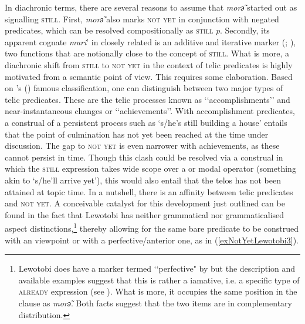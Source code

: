 In diachronic terms, there are several reasons to assume that \textit{morә̃} started out as signalling \textsc{still}. First, \textit{morә̃} also marks \textsc{not yet} in conjunction with negated predicates, which can be resolved compositionally as \textsc{still} \neg{}\textit{p}. Secondly,  its apparent cognate \mbox{\textit{muri}'} in closely related  is an additive and iterative marker (\cite{NishiyamaKelen2007}; \cite{Pampus2010}), two functions that are notionally close to the concept of \textsc{still}.  What is more, a diachronic shift from \textsc{still} to \textsc{not yet} in the context of telic predicates is highly motivated from a semantic point of view. This requires some elaboration. Based on \citeauthor{Vendler1957}'s (\citeyear{Vendler1957}) famous classification, one can distinguish between two major types of telic predicates. These are the telic processes known as \lq\lq accomplishments\rq\rq{ }and near-instantaneous changes or \lq\lq{}achievements\rq\rq. With accomplishment predicates, a construal of a persistent process such as \lq s/he's still building a house\rq{ }entails that the point of culmination has not  yet been reached at the time under discussion. The gap to \textsc{not yet} is even narrower with achievements, as these cannot persist in time. Though this clash could be resolved via a construal in which the \textsc{still} expression takes wide scope over a  or modal operator (something akin to \lq s/he'll arrive yet\rq{}), this would also entail that the telos has not been attained at topic time. In a nutshell, there is an affinity between telic predicates and \textsc{not yet}. A conceivable catalyst for this development just outlined can be found in the fact that Lewotobi has neither grammatical  nor grammaticalised  aspect distinctions,\footnote{Lewotobi does have a marker termed \lq\lq perfective" by \textcite{Nagaya2012} but the description and available examples suggest that this is rather a iamative, i.e. a specific type of \textsc{already} expression (see \cite{Olsson2013}). What is more, it occupies the same position in the clause as \textit{morә̃}. Both facts suggest that the two items are in complementary distribution.} thereby allowing for the same bare predicate to be construed with an  viewpoint or with a perfective/anterior one, as in (\ref{exNotYetLewotobi3}).

